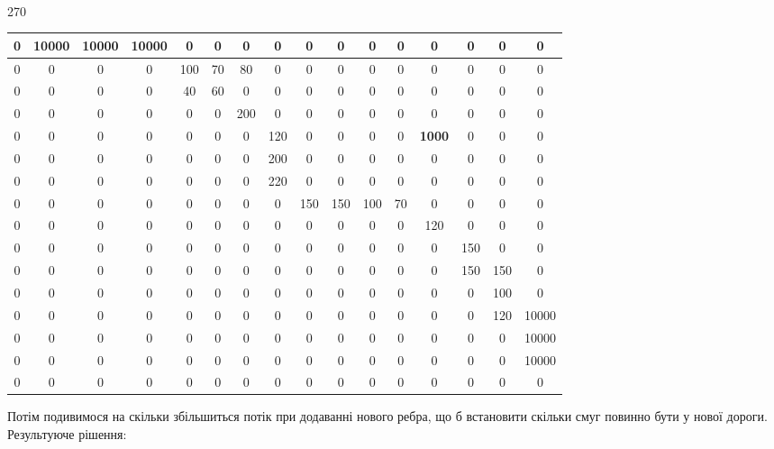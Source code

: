 \documentclass[a4paper,14pt,russian,ukrainian,oneside,final]{extreport}
\begin{document}
\\
\begin{center}
\begin{turn}{270}
\begin{tabular}{|c|c|c|c|c|c|c|c|c|c|c|c|c|c|c|c|}
\hline
0&10000&10000&10000&0&0&0&0&0&0&0&0&0&0&0&0 \\ \hline
0&0&0&0&100&70&80&0&0&0&0&0&0&0&0&0 \\ \hline
0&0&0&0&40&60&0&0&0&0&0&0&0&0&0&0 \\ \hline
0&0&0&0&0&0&200&0&0&0&0&0&0&0&0&0 \\ \hline
0&0&0&0&0&0&0&120&0&0&0&0&{\bf1000}&0&0&0 \\ \hline
0&0&0&0&0&0&0&200&0&0&0&0&0&0&0&0 \\ \hline
0&0&0&0&0&0&0&220&0&0&0&0&0&0&0&0 \\ \hline
0&0&0&0&0&0&0&0&150&150&100&70&0&0&0&0 \\ \hline
0&0&0&0&0&0&0&0&0&0&0&0&120&0&0&0 \\ \hline
0&0&0&0&0&0&0&0&0&0&0&0&0&150&0&0 \\ \hline
0&0&0&0&0&0&0&0&0&0&0&0&0&150&150&0 \\ \hline
0&0&0&0&0&0&0&0&0&0&0&0&0&0&100&0 \\ \hline
0&0&0&0&0&0&0&0&0&0&0&0&0&0&120&10000 \\ \hline
0&0&0&0&0&0&0&0&0&0&0&0&0&0&0&10000 \\ \hline
0&0&0&0&0&0&0&0&0&0&0&0&0&0&0&10000 \\ \hline
0&0&0&0&0&0&0&0&0&0&0&0&0&0&0&0 \\
\hline
\end{tabular}
\end{turn}
\end{center}
Потім подивимося на скільки збільшиться потік при додаванні нового ребра, що б встановити скільки смуг повинно бути у нової дороги.
Результуюче рішення:
\end{document}
